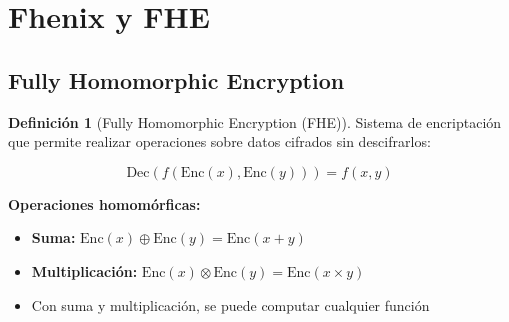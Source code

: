 \documentclass[11pt,a4paper,twoside]{book}
\theoremstyle{definition}
\newtheorem{definition}{Definición}[chapter]
\theoremstyle{remark}
\begin{document}
\section{Fhenix y FHE}
\label{sec:fhenix-fhe}

\subsection{Fully Homomorphic Encryption}

\begin{definition}[Fully Homomorphic Encryption (FHE)]
Sistema de encriptación que permite realizar operaciones sobre datos cifrados sin descifrarlos:

\[
\text{Dec}(f(\text{Enc}(x), \text{Enc}(y))) = f(x, y)
\]

\textbf{Operaciones homomórficas:}
\begin{itemize}
    \item \textbf{Suma:} $\text{Enc}(x) \oplus \text{Enc}(y) = \text{Enc}(x + y)$
    \item \textbf{Multiplicación:} $\text{Enc}(x) \otimes \text{Enc}(y) = \text{Enc}(x \times y)$
    \item Con suma y multiplicación, se puede computar cualquier función
\end{itemize}
\end{definition}
\end{document}
